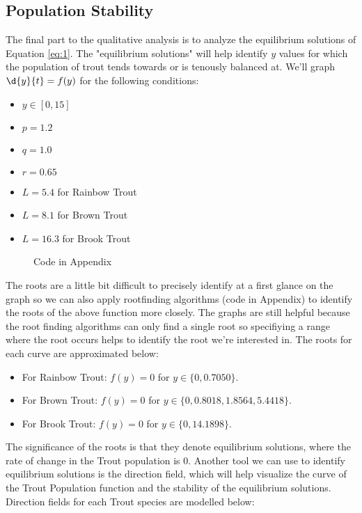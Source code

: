 \documentclass[letterpaper,12pt]{article}
\begin{document}
\subsection{Population Stability}
The final part to the qualitative analysis is to analyze the equilibrium solutions of Equation \eqref{eq:1}. The "equilibrium solutions" will help identify \(y\) values for which the population of trout tends towards or is tenously balanced at. We'll graph \(\d{y}{t} = f(y)\) for the following conditions:
\begin{itemize}
    \item \(y \in [0, 15]\)
    \item \(p = 1.2\)
    \item \(q = 1.0\)
    \item \(r = 0.65\)
    \item \(L = 5.4\) for Rainbow Trout
    \item \(L = 8.1\) for Brown Trout
    \item \(L = 16.3\) for Brook Trout
\end{itemize}
\begin{figure}[H]
    \centering
    
    \caption{Code in Appendix}
    \label{fig:3}
\end{figure}
The roots are a little bit difficult to precisely identify at a first glance on the graph so we can also apply rootfinding algorithms (code in Appendix) to identify the roots of the above function more closely. 
The graphs are still helpful because the root finding algorithms can only find a single root so specifiying a range where the root occurs helps to identify the root we're interested in.
The roots for each curve are approximated below:
\begin{itemize}
    \item For Rainbow Trout: \(f(y) = 0\) for \(y \in \{0, 0.7050\}\).
    \item For Brown Trout: \(f(y) = 0\) for \(y \in \{0, 0.8018, 1.8564, 5.4418\}\).
    \item For Brook Trout: \(f(y) = 0\) for \(y \in \{0, 14.1898\}\).
\end{itemize}
The significance of the roots is that they denote equilibrium solutions, where the rate of change in the Trout population is 0.
Another tool we can use to identify equilibrium solutions is the direction field, which will help visualize the curve of the Trout Population function and the stability of the equilibrium solutions.
Direction fields for each Trout species are modelled below:
\end{document}
